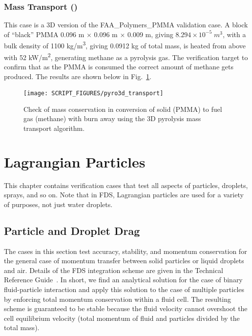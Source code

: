 \documentclass[11pt]{book}
\begin{document}
\subsection{Mass Transport (\texorpdfstring{}{pyro3d\_transport})}
\label{pyro3d_transport}

This case is a 3D version of the {\ct FAA\_Polymers\_PMMA} validation case.  A block of ``black'' PMMA 0.096 m $\times$ 0.096 m $\times$ 0.009 m, giving $8.294 \times 10^{-5} \;\si{m^3}$, with a bulk density of 1100 \si{kg/m^3}, giving 0.0912 kg of total mass, is heated from above with 52 \si{kW/m^2}, generating methane as a pyrolysis gas.  The verification target to confirm that as the PMMA is consumed the correct amount of methane gets produced.  The results are shown below in Fig.~\ref{fig:pyro3d_transport}.

\begin{figure}[!ht]
    \centering
    \texttt{[image: SCRIPT\_FIGURES/pyro3d\_transport]}
    \caption[PYRO3D with mass transport of fuel gas (the {\ct pyro3d\_transport} case)]{Check of mass conservation in conversion of solid (PMMA) to fuel gas (methane) with burn away using the 3D pyrolysis mass transport algorithm.}
    \label{fig:pyro3d_transport}
\end{figure}

\chapter{Lagrangian Particles}

This chapter contains verification cases that test all aspects of particles, droplets, sprays, and so on. Note that in FDS, Lagrangian particles are used for a variety of purposes, not just water droplets.

\section{Particle and Droplet Drag}

The cases in this section test accuracy, stability, and momentum conservation for the general case of momentum transfer between solid particles or liquid droplets and air. Details of the FDS integration scheme are given in the Technical Reference Guide~\cite{FDS_Tech_Guide}.  In short, we find an analytical solution for the case of binary fluid-particle interaction and apply this solution to the case of multiple particles by enforcing total momentum conservation within a fluid cell.  The resulting scheme is guaranteed to be stable because the fluid velocity cannot overshoot the cell equilibrium velocity (total momentum of fluid and particles divided by the total mass).
\end{document}
